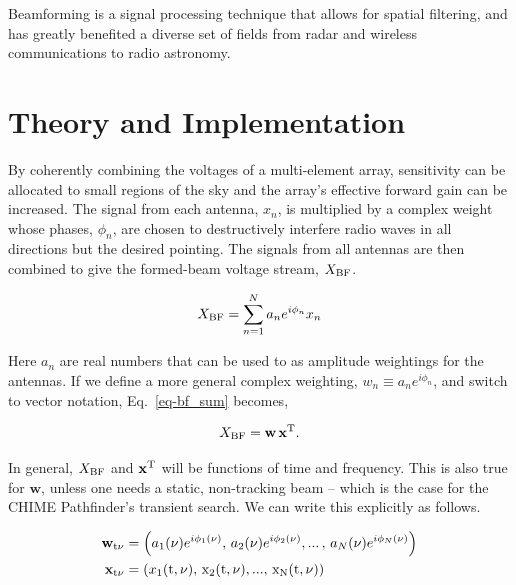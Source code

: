 Beamforming is a signal processing technique that allows for 
spatial filtering, and has greatly benefited a diverse set of fields 
from radar and wireless communications to radio astronomy.

  
  
\section{Theory and Implementation}
\label{sec:theory}

By coherently combining the voltages of a multi-element array, 
sensitivity can be allocated to small regions of the sky and 
the array's effective forward gain can be increased. The signal 
from each antenna, $x_n$, is multiplied by a complex weight whose 
phases, $\phi_{n}$, are chosen to destructively interfere radio waves 
in all directions but the desired pointing. The signals 
from all antennas are then combined to give the formed-beam 
voltage stream, $X_{\rm BF}$.

\begin{equation}
\label{eq-bf_sum}
X_{\rm BF} = \sum_{{n}=1}^N a_n e^{i\phi_{n}} x_n
\end{equation}

\noindent Here $a_n$ are real numbers that can be used to as 
amplitude weightings for the antennas. If we define a more 
general complex weighting, $w_n \equiv a_n e^{i\phi_{n}}$, and 
switch to vector notation, Eq.~\ref{eq-bf_sum} becomes,

\begin{equation}
X_{\rm BF} = \mathbf{w} \, \mathbf{x}^{\rm T} .
\end{equation}

\noindent In general, $X_{\rm BF}$ and $\mathbf{x}^{\rm T}$ will be 
functions of time and frequency. This is also true for $\mathbf{w}$,
unless one needs a static, non-tracking beam -- which is the case for the 
CHIME Pathfinder's transient search. We can write this explicitly as follows. 


\begin{align}
     \mathbf{w}_{\rm t \nu} &= \left (a_1(\nu) e^{i \phi_1(\nu)}, \, 
     a_2(\nu) e^{i \phi_2(\nu)}, ... \,, \,a_N(\nu) e^{i \phi_N(\nu)} \right )\\
     \mathbf{x}_{\rm t \nu} &= \left ( x_1(\rm{t}, \nu), \, x_2(\rm{t}, \nu), 
     ..., \, x_N(\rm{t}, \nu) \right )
\end{align}

